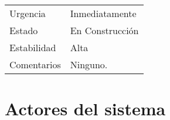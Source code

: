 \begin{table}[H]
\begin{tabular}{ll}
		Urgencia     & Inmediatamente                                                                                                                                                                                                                           \\
		Estado       & En Construcci\'on                                                                                                                                                                                                                          \\
		Estabilidad  & Alta                                                                                                                                                                                                                                     \\
		Comentarios  & Ninguno.                                                                                                                                                                                                                                
	\end{tabular}
\end{table}


\section{Actores del sistema}